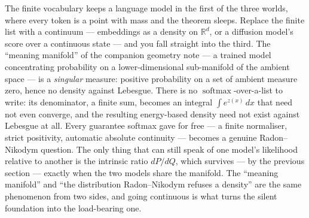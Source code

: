\documentclass[11pt]{article}
\begin{document}
The finite vocabulary keeps a language model in the first of the three worlds, where every
token is a point with mass and the theorem sleeps. Replace the finite list with a continuum
--- embeddings as a density on $\mathbb{R}^d$, or a diffusion model's score over a continuous
state --- and you fall straight into the third. The ``meaning manifold'' of the companion
geometry note --- a trained model concentrating probability on a lower-dimensional
sub-manifold of the ambient space --- is a \emph{singular} measure: positive probability on a
set of ambient measure zero, hence no density against Lebesgue. There is no
$\operatorname{softmax}$-over-a-list to write: its denominator, a finite sum, becomes an
integral $\int e^{z(x)}\,dx$ that need not even converge, and the resulting energy-based
density need not exist against Lebesgue at all. Every guarantee softmax gave for free --- a
finite normaliser, strict positivity, automatic absolute continuity --- becomes a genuine
Radon--Nikodym question. The only thing that can still speak of one model's likelihood
relative to another is the intrinsic ratio $dP/dQ$,
which survives --- by the previous section --- exactly when the two models share the manifold.
The ``meaning manifold'' and ``the distribution Radon--Nikodym refuses a density'' are the
same phenomenon from two sides, and going continuous is what turns the silent foundation into
the load-bearing one.
\end{document}
